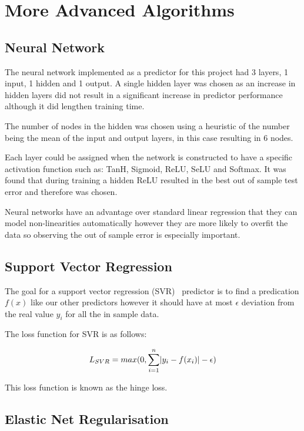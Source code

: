 \documentclass[10pt,twocolumn,letterpaper]{article}
\DeclarePairedDelimiter\abs{\lvert}{\rvert}%
\begin{document}
\section{More Advanced Algorithms}

\subsection{Neural Network}
The neural network implemented as a predictor for this project had 3 layers, 1 input, 1 hidden and 1 output. A single hidden layer was chosen as an increase in hidden layers did not result in a significant increase in predictor performance although it did lengthen training time.

The number of nodes in the hidden was chosen using a heuristic of the number being the mean of the input and output layers, in this case resulting in 6 nodes.

Each layer could be assigned when the network is constructed to have a specific activation function such as: TanH, Sigmoid, ReLU, SeLU and Softmax. It was found that during training a hidden ReLU resulted in the best out of sample test error and therefore was chosen. 

Neural networks have an advantage over standard linear regression that they can model non-linearities automatically however they are more likely to overfit the data so observing the out of sample error is especially important.

\subsection{Support Vector Regression}
The goal for a support vector regression (SVR)~\cite{Cortes1995} predictor is to find a predication $f(x)$ like our other predictors however it should have at most $\epsilon$ deviation from the real value $y_i$ for all the in sample data.

The loss function for SVR is as follows:

\begin{equation}
L_{SVR} = max(0, \sum_{i = 1}^{n} \abs{y_i - f(x_i)} - \epsilon)
\end{equation}

This loss function is known as the hinge loss.

\subsection{Elastic Net Regularisation}



{\small


}
\end{document}
